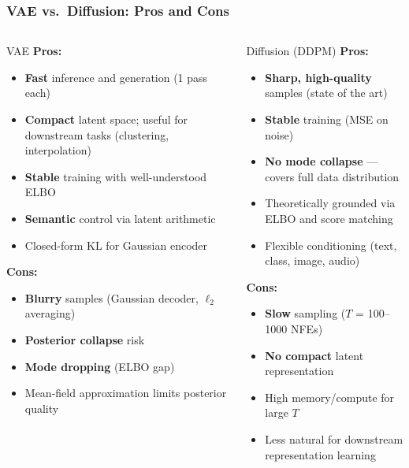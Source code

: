 \documentclass{beamer}
\begin{document}
\begin{frame}
\frametitle{VAE vs.\ Diffusion: Pros and Cons}

\begin{columns}
\begin{block}{VAE}
\textcolor{green!60!black}{\textbf{Pros:}}
\begin{itemize}\small
  \item \textbf{Fast} inference and generation (1 pass each)
  \item \textbf{Compact} latent space; useful for downstream tasks (clustering, interpolation)
  \item \textbf{Stable} training with well-understood ELBO
  \item \textbf{Semantic} control via latent arithmetic
  \item Closed-form KL for Gaussian encoder
\end{itemize}
\textcolor{red!60!black}{\textbf{Cons:}}
\begin{itemize}\small
  \item \textbf{Blurry} samples (Gaussian decoder, $\ell_2$ averaging)
  \item \textbf{Posterior collapse} risk
  \item \textbf{Mode dropping} (ELBO gap)
  \item Mean-field approximation limits posterior quality
\end{itemize}
\end{block}

\begin{block}{Diffusion (DDPM)}
\textcolor{green!60!black}{\textbf{Pros:}}
\begin{itemize}\small
  \item \textbf{Sharp, high-quality} samples (state of the art)
  \item \textbf{Stable} training (MSE on noise)
  \item \textbf{No mode collapse} — covers full data distribution
  \item Theoretically grounded via ELBO and score matching
  \item Flexible conditioning (text, class, image, audio)
\end{itemize}
\textcolor{red!60!black}{\textbf{Cons:}}
\begin{itemize}\small
  \item \textbf{Slow} sampling ($T$ = 100--1000 NFEs)
  \item \textbf{No compact} latent representation
  \item High memory/compute for large $T$
  \item Less natural for downstream representation learning
\end{itemize}
\end{block}
\end{columns}
\end{frame}
\end{document}

